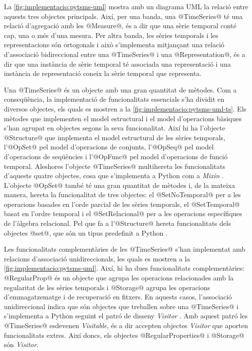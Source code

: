 La \autoref{fig:implementacio:pytsms-uml} mostra amb un diagrama
UML la relació entre aquests tres objectes principals. Així, per una
banda, una @TimeSeries@ té una relació d'agregació amb les
@Measure@, és a dir que una sèrie temporal conté cap, una o més
d'una mesura.  Per altra banda, les sèries temporals i les
representacions són ortogonals i això s'implementa mitjançant una
relació d'associació bidireccional entre una @TimeSeries@ i una
@Representation@, és a dir que una instància de sèrie temporal té
associada una representació i una instància de representació coneix la
sèrie temporal que representa.




Una @TimeSeries@ és un objecte amb una gran quantitat de
mètodes. Com a conseqüència, la implementació de funcionalitats
essencials s'ha dividit en diversos objectes, els quals es mostren a
la \autoref{fig:implementacio:pytsms-uml-ts}. Els mètodes que
implementen el model estructural i el model d'operacions bàsiques
s'han agrupat en objectes segons la seva funcionalitat. Així hi ha
l'objecte @Structure@ que implementa el model estructural de les
sèries temporals, l'@OpSet@ pel model d'operacions de conjunts,
l'@OpSeq@ pel model d'operacions de seqüències i l'@OpFunc@
pel model d'operacions de funció temporal.  Aleshores l'objecte
@TimeSeries@ multihereta les funcionalitats d'aquests quatre
objectes, cosa que s'implementa a Python com a
\emph{Mixin} \parencite[\S 8.3.6, \S 20.17]{python:doc2}.  L'objecte
@OpSet@ també té una gran quantitat de mètodes i, de la mateixa
manera, hereta la funcionalitat de tres objectes: el
@SetNoTemporal@ per a les operacions basades en l'orde parcial de
les sèries temporals, el @SetTemporal@ basat en l'ordre temporal
i el @SetRelacional@ per a les operacions específiques de
l'àlgebra relacional. Pel que fa a l'@Structure@ hereta
funcionalitats dels objectes @set@, que són un tipus predefinit a
Python \parencite[\S 5.7]{python:doc2}.


Les funcionalitats complementàries de les @TimeSeries@ s'han
implementat amb relacions d'associació unidireccionals, les quals es
mostren a la \autoref{fig:implementacio:pytsms-uml}. Així, hi ha dues
funcionalitats complementàries: @RegularProp@ és un objecte
que agrupa les operacions relacionades amb la regularitat de les
sèries temporals i @Storage@ agrupa les operacions
d'emmagatzematge i de recuperació en fitxers. En aquests casos,
l'associació unidireccional indica que són objectes que treballen
sobre una @TimeSeries@ i s'implementa a Python seguint el patró
de disseny
\emph{Visitor} \parencite[cap.~14]{ziade08:expert_python_programming}. Amb
aquest patró les @TimeSeries@ esdevenen \emph{Visitable}, és a
dir accepten objectes \emph{Visitor} que aporten funcionalitats
extres. Així doncs, els objectes @RegularProperties@ i
@Storage@ són \emph{Visitor}.


